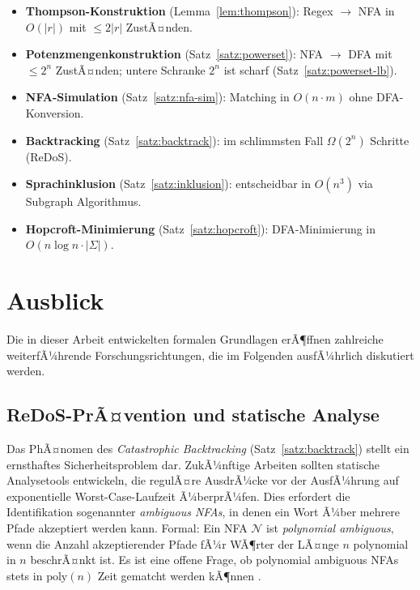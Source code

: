 ﻿\documentclass[a4paper,12pt]{article}
\theoremstyle{definition}
\begin{document}
\begin{itemize}
	\item \textbf{Thompson-Konstruktion} (Lemma~\ref{lem:thompson}): Regex $\to$
	      NFA in $O(|r|)$ mit $\leq 2|r|$ ZustÃ¤nden.
	\item \textbf{Potenzmengenkonstruktion} (Satz~\ref{satz:powerset}): NFA $\to$
	      DFA mit $\leq 2^n$ ZustÃ¤nden; untere Schranke $2^n$ ist scharf
	      (Satz~\ref{satz:powerset-lb}).
	\item \textbf{NFA-Simulation} (Satz~\ref{satz:nfa-sim}): Matching in
	      $O(n \cdot m)$ ohne DFA-Konversion.
	\item \textbf{Backtracking} (Satz~\ref{satz:backtrack}): im schlimmsten Fall
	      $\Omega(2^n)$ Schritte (ReDoS).
	\item \textbf{Sprachinklusion} (Satz~\ref{satz:inklusion}): entscheidbar in
	      $O(n^3)$ via Subgraph Algorithmus.
	\item \textbf{Hopcroft-Minimierung} (Satz~\ref{satz:hopcroft}): DFA-Minimierung
	      in $O(n \log n \cdot |\Sigma|)$.
\end{itemize}

\section{Ausblick}

Die in dieser Arbeit entwickelten formalen Grundlagen erÃ¶ffnen zahlreiche
weiterfÃ¼hrende Forschungsrichtungen, die im Folgenden ausfÃ¼hrlich diskutiert werden.

\subsection{ReDoS-PrÃ¤vention und statische Analyse}

Das PhÃ¤nomen des \emph{Catastrophic Backtracking} (Satz~\ref{satz:backtrack})
stellt ein ernsthaftes Sicherheitsproblem dar. ZukÃ¼nftige Arbeiten sollten
statische Analysetools entwickeln, die regulÃ¤re AusdrÃ¼cke vor der AusfÃ¼hrung auf
exponentielle Worst-Case-Laufzeit Ã¼berprÃ¼fen. Dies erfordert die Identifikation
sogenannter \emph{ambiguous NFAs}, in denen ein Wort Ã¼ber mehrere Pfade akzeptiert
werden kann. Formal: Ein NFA $\mathcal{N}$ ist \emph{polynomial ambiguous}, wenn
die Anzahl akzeptierender Pfade fÃ¼r WÃ¶rter der LÃ¤nge $n$ polynomial in $n$
beschrÃ¤nkt ist. Es ist eine offene Frage, ob polynomial ambiguous NFAs stets in
$\mathrm{poly}(n)$ Zeit gematcht werden kÃ¶nnen \cite{shen2018,weideman2016}.
\end{document}
